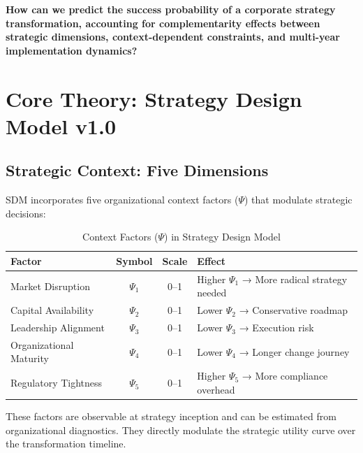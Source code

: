 \begin{tcolorbox}[colback=red!5!white, colframe=red!75!black,
    title=The Fundamental Question]
\textbf{How can we predict the success probability of a corporate strategy transformation, accounting for complementarity effects between strategic dimensions, context-dependent constraints, and multi-year implementation dynamics?}
\end{tcolorbox}

\section{Core Theory: Strategy Design Model v1.0}
\label{sec:sdm-theory}

\subsection{Strategic Context: Five Dimensions}
\label{subsec:sdm-context}

SDM incorporates five organizational context factors ($\Psi$) that modulate strategic decisions:

\begin{table}[htbp]
\centering
\caption{Context Factors ($\Psi$) in Strategy Design Model}
\label{tab:sdm-context}
\renewcommand{\arraystretch}{1.4}
\begin{tabular}{@{}lccp{5cm}@{}}
\toprule
\textbf{Factor} & \textbf{Symbol} & \textbf{Scale} & \textbf{Effect} \\
\midrule
Market Disruption & $\Psi_1$ & 0--1 & Higher $\Psi_1$ → More radical strategy needed \\
Capital Availability & $\Psi_2$ & 0--1 & Lower $\Psi_2$ → Conservative roadmap \\
Leadership Alignment & $\Psi_3$ & 0--1 & Lower $\Psi_3$ → Execution risk \\
Organizational Maturity & $\Psi_4$ & 0--1 & Lower $\Psi_4$ → Longer change journey \\
Regulatory Tightness & $\Psi_5$ & 0--1 & Higher $\Psi_5$ → More compliance overhead \\
\bottomrule
\end{tabular}
\end{table}

These factors are observable at strategy inception and can be estimated from organizational diagnostics. They directly modulate the strategic utility curve over the transformation timeline.

